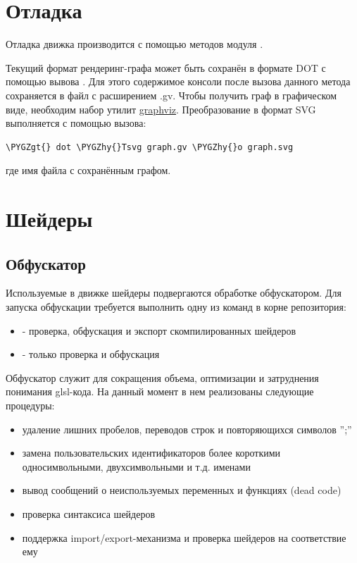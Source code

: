 \documentclass[a4paper,12pt,oneside]{sphinxmanual}
\def\PYGZgt{\char`\>}
\def\PYGZhy{\char`\-}
\begin{document}
\section{Отладка}
\label{developers:id10}
Отладка движка производится с помощью методов модуля .

Текущий формат рендеринг-графа может быть сохранён в формате DOT с помощью
вывова . Для этого содержимое консоли после
вызова данного метода сохраняется в файл с расширением .gv. Чтобы получить граф
в графическом виде, необходим набор утилит \href{http://www.graphviz.org/}{graphviz}.
Преобразование в формат SVG выполняется с помощью вызова:

\begin{Verbatim}[commandchars=\\\{\}]
\PYGZgt{} dot \PYGZhy{}Tsvg graph.gv \PYGZhy{}o graph.svg
\end{Verbatim}

где  имя файла с сохранённым графом.


\section{Шейдеры}
\label{developers:id11}\label{developers:shaders}

\subsection{Обфускатор}
\label{developers:id12}\label{developers:index-0}
Используемые в движке шейдеры подвергаются обработке обфускатором.
Для запуска обфускации требуется выполнить одну из команд в корне репозитория:
\begin{itemize}
\item {} 
 - проверка, обфускация и экспорт скомпилированных шейдеров

\item {} 
 - только проверка и обфускация

\end{itemize}

Обфускатор служит для сокращения объема, оптимизации и затруднения понимания
glsl-кода. На данный момент в нем реализованы следующие процедуры:
\begin{itemize}
\item {} 
удаление лишних пробелов, переводов строк и повторяющихся символов '';''

\item {} 
замена пользовательских идентификаторов более короткими односимвольными, двухсимвольными и т.д. именами

\item {} 
вывод сообщений о неиспользуемых переменных и функциях (dead code)

\item {} 
проверка синтаксиса шейдеров

\item {} 
поддержка import/export-механизма и проверка шейдеров на соответствие ему

\end{itemize}
\end{document}
